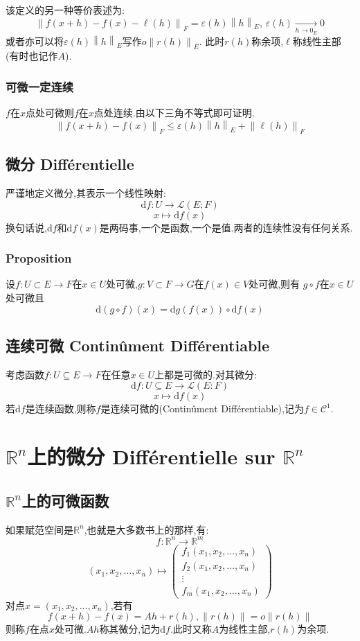 \documentclass[12pt, a4paper, oneside]{ctexbook}
\newcommand{\di }{\text{d}}%
\newcommand{\R }{\mathbb{R}}%
\newcommand{\C }{\mathcal{C}}%
\begin{document}
    该定义的另一种等价表述为:
    $$
    \left\lVert f(x+h)-f(x)-\ell(h)\right\rVert _F =\varepsilon(h)\left\lVert h \right\rVert _E,\,\varepsilon (h)\xrightarrow[h\rightarrow 0_E]{}0
    $$
    或者亦可以将$\varepsilon(h)\left\lVert h \right\rVert _E$写作$o \left\lVert r(h) \right\rVert _E$.
    此时$r(h)$称余项,$\ell$称线性主部(有时也记作$A$).
    \subsubsection{可微一定连续}
    $f$在$x$点处可微则$f$在$x$点处连续.由以下三角不等式即可证明.
    $$
    \left\lVert f(x+h)-f(x)\right\rVert _F\leq \varepsilon(h)\left\lVert h \right\rVert _E+\left\lVert \ell(h) \right\rVert _F
    $$
\subsection{微分 Différentielle}
    严谨地定义微分,其表示一个线性映射:
    $$
      \di f:U\rightarrow \mathcal{L}(E;F)
    $$
    $$
      x\mapsto \di f(x)
    $$
    换句话说,$\di f$和$\di f(x)$是两码事,一个是函数,一个是值.两者的连续性没有任何关系.
    \subsubsection{Proposition}
    设$f:U\subset E\rightarrow F$在$x\in U$处可微,$g:V\subset F\rightarrow G$在$f(x)\in V$处可微,则有
    $g\circ f$在$x\in U$处可微且
    $$
    \di (g\circ f)(x)=\di g(f(x))\circ \di f(x)
    $$
\subsection{连续可微 Continûment Différentiable}
    考虑函数$f:U\subseteq E\rightarrow F$在任意$x\in U$上都是可微的.对其微分:
    $$
      \di f:U\subseteq E\rightarrow \mathcal{L} (E:F)
    $$
    $$
      x\mapsto \di f(x)
    $$
    若$\di f$是连续函数,则称$f$是连续可微的(Continûment Différentiable),记为$f\in\C^1$.



\section{$\R^n$上的微分 Différentielle sur $\R^n$}
\subsection{$\R^n$上的可微函数 }
    如果赋范空间是$\R^n$,也就是大多数书上的那样,有:
    $$
      f:\R^n\rightarrow \R^m
    $$
    $$
    (x_1,x_2,\dots,x_n)\mapsto 
    \begin{pmatrix}
      f_1(x_1,x_2,\dots,x_n)\\
      f_2(x_1,x_2,\dots,x_n)\\
      \vdots\\
     f_m(x_1,x_2,\dots,x_n)
     \end{pmatrix}
    $$
    对点$x=(x_1,x_2,\dots,x_n)$,若有
    $$
    f(x+h)-f(x)=Ah+r(h),\left\lVert r(h) \right\rVert =o\left\lVert r(h) \right\rVert 
    $$
    则称$f$在点$x$处可微.$Ah$称其微分,记为$\di f$.此时又称$A$为线性主部,$r(h)$为余项.
\end{document}
